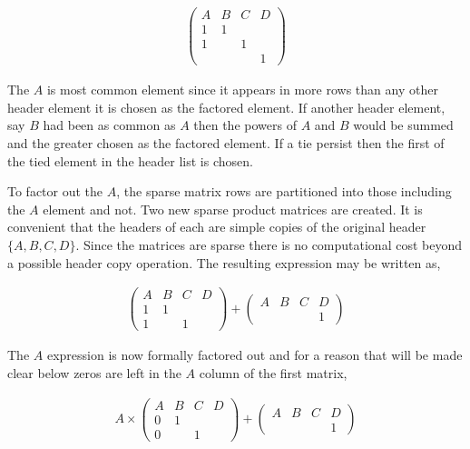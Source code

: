 \begin{align*}
\begin{pmatrix}A & B & C & D\\1 & 1 & &\\1 & & 1 &\\& & & 1\end{pmatrix}
\end{align*}

The $A$ is most common element since it appears in more rows than any other header element it is chosen as the factored element. If another header element, say $B$ had been as common as $A$ then the powers of $A$ and $B$ would be summed and the greater chosen as the factored element. If a tie persist then the first of the tied element in the header list is chosen.

To factor out the $A$, the sparse matrix rows are partitioned into those including the $A$ element and not. Two new sparse product matrices are created. It is convenient that the headers of each are simple copies of the original header $\{A, B, C, D\}$. Since the matrices are sparse there is no computational cost beyond a possible header copy operation. The resulting expression may be written as,

\begin{align*}
  \begin{pmatrix}A & B & C & D\\
                 1 & 1 &   &  \\
                 1 &   & 1 &\end{pmatrix} 
+ \begin{pmatrix}A & B & C & D\\
                   &   &   & 1 \end{pmatrix}
\end{align*}

The $A$ expression is now formally factored out and for a reason that will be made clear below zeros are left in the $A$ column of the first matrix,

\begin{align*}
A \times\begin{pmatrix}A & B & C & D\\
                       0 & 1 &   &  \\
                       0 &   & 1 &\end{pmatrix} 
+       \begin{pmatrix}A & B & C & D\\
                       &   &   & 1 \end{pmatrix}
\end{align*}

